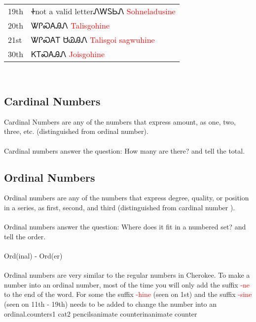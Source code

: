 \begin{multicols}
\vfill\newpage\begin{minipage}{\linewidth}\begin{tabular}{p{5cm} p{9cm}}
19th & Ꮠnot a valid letterᏁᎳᏚᏏᏁ 
 \newline \textcolor{red}{Sohneladusine}\\
20th & ᏔᎵᏍᎪᎯᏁ 
 \newline \textcolor{red}{Talisgohine}\\
21st & ᏔᎵᏍᎪᎢ ᏌᏊᎯᏁ 
 \newline \textcolor{red}{Talisgoi sagwuhine}\\
30th & ᏦᎢᏍᎪᎯᏁ 
 \newline \textcolor{red}{Joisgohine}\\
\end{tabular}
\end{minipage}

\
\subsection{Cardinal Numbers}
Cardinal Numbers are any of the numbers that express amount, as one, two, three,  etc. (distinguished from ordinal number).\cite{cardinalNumbers}\\\\
Cardinal numbers answer the question: How many are there? and tell the total.\
\index{Ordinal Numbers}\subsection{Ordinal Numbers}
Ordinal numbers are any of the numbers that express degree, quality, or position in a series, as first, second, and third  (distinguished from cardinal number ).\cite{ordinalNumbers}\\\\
\noindent Ordinal numbers answer the question: Where does it fit in a numbered set? and tell the order.\\\\
\noindent Ord(inal) - Ord(er)\\\\
Ordinal numbers are very similar to the regular numbers in Cherokee. To make a number into an ordinal number, most of the time you will only add the suffix \textcolor{red}{-ne} to the end of the word. For some the suffix \textcolor{red}{-hine} (seen on 1st) and the suffix \textcolor{red}{-sine} (seen on 11th - 19th) needs to be added to change the number into an ordinal.\cite{walc141}counters1 cat2 pencilsanimate counterinanimate counter
\index{}

\end{multicols}
